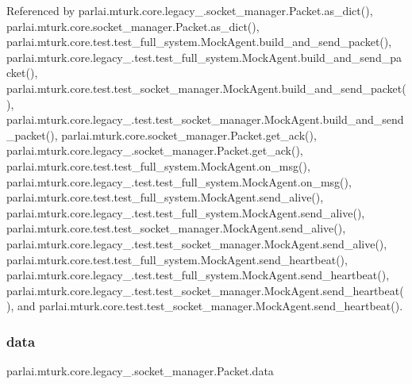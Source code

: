 Referenced by parlai.\+mturk.\+core.\+legacy\+\_.\+socket\+\_\+manager.\+Packet.\+as\+\_\+dict(), parlai.\+mturk.\+core.\+socket\+\_\+manager.\+Packet.\+as\+\_\+dict(), parlai.\+mturk.\+core.\+test.\+test\+\_\+full\+\_\+system.\+Mock\+Agent.\+build\+\_\+and\+\_\+send\+\_\+packet(), parlai.\+mturk.\+core.\+legacy\+\_.\+test.\+test\+\_\+full\+\_\+system.\+Mock\+Agent.\+build\+\_\+and\+\_\+send\+\_\+packet(), parlai.\+mturk.\+core.\+test.\+test\+\_\+socket\+\_\+manager.\+Mock\+Agent.\+build\+\_\+and\+\_\+send\+\_\+packet(), parlai.\+mturk.\+core.\+legacy\+\_.\+test.\+test\+\_\+socket\+\_\+manager.\+Mock\+Agent.\+build\+\_\+and\+\_\+send\+\_\+packet(), parlai.\+mturk.\+core.\+socket\+\_\+manager.\+Packet.\+get\+\_\+ack(), parlai.\+mturk.\+core.\+legacy\+\_.\+socket\+\_\+manager.\+Packet.\+get\+\_\+ack(), parlai.\+mturk.\+core.\+test.\+test\+\_\+full\+\_\+system.\+Mock\+Agent.\+on\+\_\+msg(), parlai.\+mturk.\+core.\+legacy\+\_.\+test.\+test\+\_\+full\+\_\+system.\+Mock\+Agent.\+on\+\_\+msg(), parlai.\+mturk.\+core.\+test.\+test\+\_\+full\+\_\+system.\+Mock\+Agent.\+send\+\_\+alive(), parlai.\+mturk.\+core.\+legacy\+\_.\+test.\+test\+\_\+full\+\_\+system.\+Mock\+Agent.\+send\+\_\+alive(), parlai.\+mturk.\+core.\+test.\+test\+\_\+socket\+\_\+manager.\+Mock\+Agent.\+send\+\_\+alive(), parlai.\+mturk.\+core.\+legacy\+\_.\+test.\+test\+\_\+socket\+\_\+manager.\+Mock\+Agent.\+send\+\_\+alive(), parlai.\+mturk.\+core.\+test.\+test\+\_\+full\+\_\+system.\+Mock\+Agent.\+send\+\_\+heartbeat(), parlai.\+mturk.\+core.\+legacy\+\_.\+test.\+test\+\_\+full\+\_\+system.\+Mock\+Agent.\+send\+\_\+heartbeat(), parlai.\+mturk.\+core.\+legacy\+\_.\+test.\+test\+\_\+socket\+\_\+manager.\+Mock\+Agent.\+send\+\_\+heartbeat(), and parlai.\+mturk.\+core.\+test.\+test\+\_\+socket\+\_\+manager.\+Mock\+Agent.\+send\+\_\+heartbeat().

\mbox{\label{classparlai_1_1mturk_1_1core_1_1legacy__2018_1_1socket__manager_1_1Packet_adcb59e4297d2ac5842f963591a2c8aff}} 
\subsubsection{\texorpdfstring{data}{data}}
{\footnotesize\ttfamily parlai.\+mturk.\+core.\+legacy\+\_.\+socket\+\_\+manager.\+Packet.\+data}



